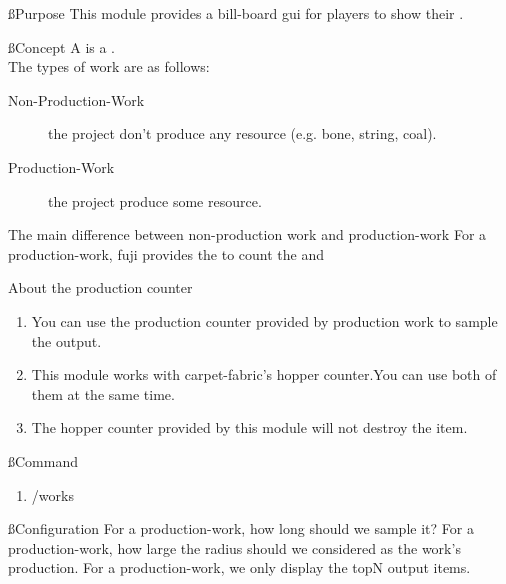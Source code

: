 
\ss{Purpose}
This module provides a bill-board gui for players to show their .

\ss{Concept}
A  is a . \\
The types of work are as follows:
\begin{description}
    \item [Non-Production-Work] the project don't produce any resource (e.g. bone, string, coal).
    \item[Production-Work] the project produce some resource.
\end{description}

\begin{tips}{The main difference between non-production work and production-work}
    For a production-work, fuji provides the  to count the  and 
\end{tips}

\begin{tips}{About the production counter}
    \begin{enumerate}
        \item You can use the production counter provided by production work to sample the output.
        \item This module works with carpet-fabric's hopper counter.You can use both of them at the same time.
        \item The hopper counter provided by this module will not destroy the item.
    \end{enumerate}

\end{tips}

\ss{Command}
\begin{enumerate}
    \item /works
\end{enumerate}

\ss{Configuration}
For a production-work, how long should we sample it?
For a production-work, how large the radius should we considered as the work's production.
For a production-work, we only display the topN output items.








